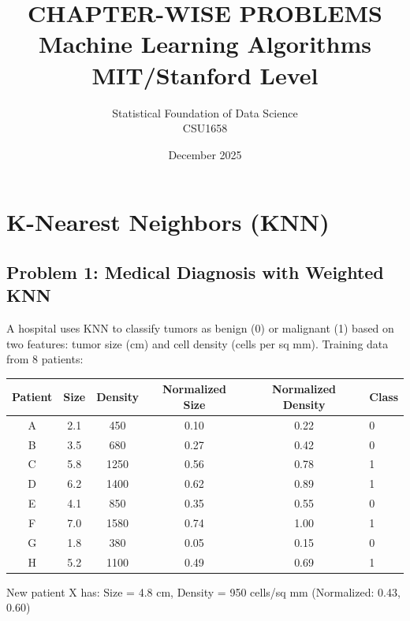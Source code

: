 \documentclass[12pt]{article}
\title{CHAPTER-WISE PROBLEMS\\
\large Machine Learning Algorithms\\
\small MIT/Stanford Level}
\author{Statistical Foundation of Data Science\\
CSU1658}
\date{December 2025}
\begin{document}
\maketitle

\tableofcontents
\newpage


\section{K-Nearest Neighbors (KNN)}

\subsection*{Problem 1: Medical Diagnosis with Weighted KNN}

A hospital uses KNN to classify tumors as benign (0) or malignant (1) based on two features: tumor size (cm) and cell density (cells per sq mm). Training data from 8 patients:

\begin{center}
\begin{tabular}{ccccc}
\toprule
Patient & Size & Density & Normalized Size & Normalized Density & Class \\
\midrule
A & 2.1 & 450 & 0.10 & 0.22 & 0 \\
B & 3.5 & 680 & 0.27 & 0.42 & 0 \\
C & 5.8 & 1250 & 0.56 & 0.78 & 1 \\
D & 6.2 & 1400 & 0.62 & 0.89 & 1 \\
E & 4.1 & 850 & 0.35 & 0.55 & 0 \\
F & 7.0 & 1580 & 0.74 & 1.00 & 1 \\
G & 1.8 & 380 & 0.05 & 0.15 & 0 \\
H & 5.2 & 1100 & 0.49 & 0.69 & 1 \\
\bottomrule
\end{tabular}
\end{center}

New patient X has: Size = 4.8 cm, Density = 950 cells/sq mm (Normalized: 0.43, 0.60)
\end{document}
